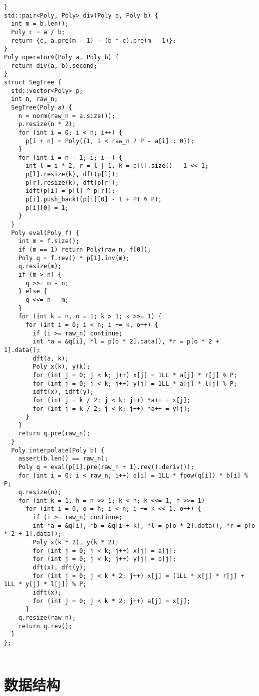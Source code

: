 \documentclass[]{article}
\begin{document}
\begin{verbatim}
}
std::pair<Poly, Poly> div(Poly a, Poly b) {
  int m = b.len();
  Poly c = a / b;
  return {c, a.pre(m - 1) - (b * c).pre(m - 1)};
}
Poly operator%(Poly a, Poly b) {
  return div(a, b).second;
}
struct SegTree {
  std::vector<Poly> p;
  int n, raw_n;
  SegTree(Poly a) {
    n = norm(raw_n = a.size());
    p.resize(n * 2);
    for (int i = 0; i < n; i++) {
      p[i + n] = Poly({1, i < raw_n ? P - a[i] : 0});
    }
    for (int i = n - 1; i; i--) {
      int l = i * 2, r = l | 1, k = p[l].size() - 1 << 1;
      p[l].resize(k), dft(p[l]);
      p[r].resize(k), dft(p[r]);
      idft(p[i] = p[l] ^ p[r]);
      p[i].push_back((p[i][0] - 1 + P) % P);
      p[i][0] = 1;
    }
  }
  Poly eval(Poly f) {
    int m = f.size();
    if (m == 1) return Poly(raw_n, f[0]);
    Poly q = f.rev() * p[1].inv(m);
    q.resize(m);
    if (m > n) {
      q >>= m - n;
    } else {
      q <<= n - m;
    }
    for (int k = n, o = 1; k > 1; k >>= 1) {
      for (int i = 0; i < n; i += k, o++) {
        if (i >= raw_n) continue;
        int *a = &q[i], *l = p[o * 2].data(), *r = p[o * 2 + 1].data();
        dft(a, k);
        Poly x(k), y(k);
        for (int j = 0; j < k; j++) x[j] = 1LL * a[j] * r[j] % P;
        for (int j = 0; j < k; j++) y[j] = 1LL * a[j] * l[j] % P;
        idft(x), idft(y);
        for (int j = k / 2; j < k; j++) *a++ = x[j];
        for (int j = k / 2; j < k; j++) *a++ = y[j];
      }
    }
    return q.pre(raw_n);
  }
  Poly interpolate(Poly b) {
    assert(b.len() == raw_n);
    Poly q = eval(p[1].pre(raw_n + 1).rev().deriv());
    for (int i = 0; i < raw_n; i++) q[i] = 1LL * fpow(q[i]) * b[i] % P;
    q.resize(n);
    for (int k = 1, h = n >> 1; k < n; k <<= 1, h >>= 1)
      for (int i = 0, o = h; i < n; i += k << 1, o++) {
        if (i >= raw_n) continue;
        int *a = &q[i], *b = &q[i + k], *l = p[o * 2].data(), *r = p[o * 2 + 1].data();
        Poly x(k * 2), y(k * 2);
        for (int j = 0; j < k; j++) x[j] = a[j];
        for (int j = 0; j < k; j++) y[j] = b[j];
        dft(x), dft(y);
        for (int j = 0; j < k * 2; j++) x[j] = (1LL * x[j] * r[j] + 1LL * y[j] * l[j]) % P;
        idft(x);
        for (int j = 0; j < k * 2; j++) a[j] = x[j];
      }
    q.resize(raw_n);
    return q.rev();
  }
};


\end{verbatim}

\hypertarget{ux6570ux636eux7ed3ux6784}{%
\section{数据结构}\label{ux6570ux636eux7ed3ux6784}}
\end{document}
